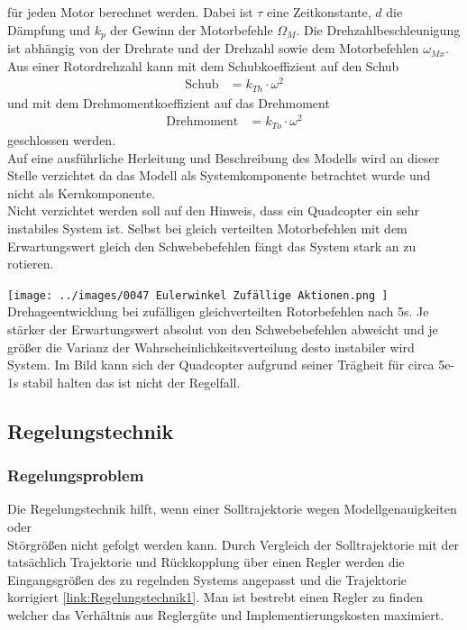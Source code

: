 für jeden Motor berechnet werden.
Dabei ist $\tau$ eine Zeitkonstante, $d$ die Dämpfung und $k_p$ der Gewinn der Motorbefehle $\Omega_{M}$.
Die Drehzahlbeschleunigung ist abhängig von der Drehrate und der Drehzahl sowie dem Motorbefehlen $\omega_{Mx}$. Aus einer Rotordrehzahl kann mit dem Schubkoeffizient auf den Schub
\begin{align}
	\text{Schub} &= k_{Th}\cdot \omega^2
\end{align} und mit dem Drehmomentkoeffizient auf das Drehmoment
\begin{align}
	\text{Drehmoment} &= k_{To}\cdot \omega^2
\end{align}
geschlossen werden.\\
Auf eine ausführliche Herleitung und Beschreibung des Modells wird an dieser Stelle verzichtet da das Modell als Systemkomponente betrachtet wurde und nicht als Kernkomponente.\\
Nicht verzichtet werden soll auf den Hinweis, dass ein Quadcopter ein sehr instabiles System ist. Selbst bei gleich verteilten Motorbefehlen mit dem Erwartungswert gleich den Schwebebefehlen fängt das System stark an zu rotieren.
\begin{center}
	\texttt{[image: ../images/0047 Eulerwinkel Zufällige Aktionen.png
	]}{\\Drehageentwicklung bei zufälligen gleichverteilten Rotorbefehlen nach 5s. Je stärker der Erwartungswert absolut von den Schwebebefehlen abweicht und je größer die Varianz der Wahrscheinlichkeitsverteilung desto instabiler wird System. Im Bild kann sich der Quadcopter aufgrund seiner Trägheit für circa 5e-1s stabil halten das ist nicht der Regelfall.}
\end{center}



\subsection{Regelungstechnik}

\subsubsection{Regelungsproblem}
Die Regelungstechnik hilft, wenn einer Solltrajektorie wegen Modellgenauigkeiten oder\\ Störgrößen nicht gefolgt werden kann. Durch Vergleich der Solltrajektorie mit der tatsächlich Trajektorie und Rückkopplung über einen Regler werden die Eingangsgrößen des zu regelnden Systems angepasst und die Trajektorie korrigiert \ref{link:Regelungstechnik1}. Man ist bestrebt einen Regler zu finden welcher das Verhältnis aus Reglergüte und Implementierungskosten maximiert.


